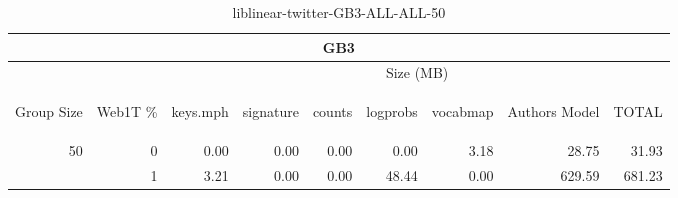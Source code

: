 \begin{center}
\begin{table}[htbp]
\begin{tabular}{ | r | r | r | r | r | r | r | r | r |}
\hline
\multicolumn{9}{|c|}{GB3}\\
\hline
 & & \multicolumn{7}{|c|}{Size (MB)}\\ \cline{3-9}
\begin{sideways}Group Size\end{sideways} & \begin{sideways}Web1T \% \end{sideways} & \begin{sideways}keys.mph\end{sideways} & \begin{sideways}signature\end{sideways} & \begin{sideways}counts\end{sideways} & \begin{sideways}logprobs\end{sideways} & \begin{sideways}vocabmap\end{sideways} & \begin{sideways}Authors Model \end{sideways} & \begin{sideways}TOTAL\end{sideways}\\
\hline
\multirow{1}{*}{50}
 & 0 & 0.00 & 0.00 & 0.00 & 0.00 & 3.18 & 28.75 & 31.93\\ \cline{2-9}
 & 1 & 3.21 & 0.00 & 0.00 & 48.44 & 0.00 & 629.59 & 681.23\\ \cline{2-9}
\hline
\end{tabular}
\caption{liblinear-twitter-GB3-ALL-ALL-50}
\label{table:liblinear-twitter-GB3-ALL-ALL-50}
\end{table}
\end{center}


